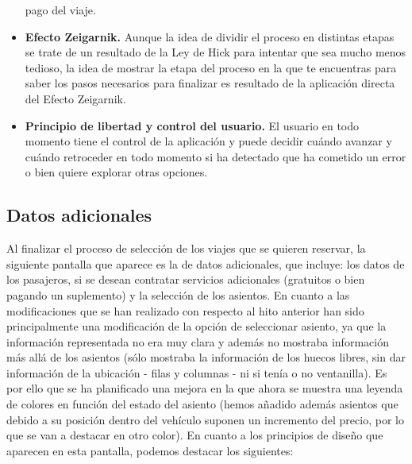 \begin{itemize}
        pago del viaje.
    \item \textbf{Efecto Zeigarnik.} Aunque la idea de dividir el proceso en distintas etapas se trate de un resultado de la
        Ley de Hick para intentar que sea mucho menos tedioso, la idea de mostrar la etapa del proceso en la que te
        encuentras para saber los pasos necesarios para finalizar es resultado de la aplicación directa del Efecto
        Zeigarnik.
    \item \textbf{Principio de libertad y control del usuario.} El usuario en todo momento tiene el control de la aplicación
        y puede decidir cuándo avanzar y cuándo retroceder en todo momento si ha detectado que ha cometido un error
        o bien quiere explorar otras opciones.
\end{itemize}

\subsection*{Datos adicionales}

Al finalizar el proceso de selección de los viajes que se quieren reservar, la siguiente pantalla que aparece es
la de datos adicionales, que incluye: los datos de los pasajeros, si se desean contratar servicios
adicionales (gratuitos o bien pagando un suplemento) y la selección de los asientos. En cuanto a las modificaciones
que se han realizado con respecto al hito anterior han sido principalmente una modificación de la opción de seleccionar
asiento, ya que la información representada no era muy clara y además no mostraba información más allá de los asientos
(sólo mostraba la información de los huecos libres, sin dar información de la ubicación - filas y columnas - ni si
tenía o no ventanilla). Es por ello que se ha planificado una mejora en la que ahora se muestra una leyenda de
colores en función del estado del asiento (hemos añadido además asientos que debido a su posición dentro del vehículo
suponen un incremento del precio, por lo que se van a destacar en otro color). En cuanto a los principios de diseño que
aparecen en esta pantalla, podemos destacar los siguientes:


